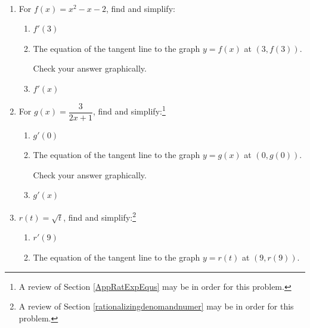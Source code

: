 \documentclass{ximera}
\begin{document}
\begin{ex}  \label{morederivativesex} $~$

\begin{enumerate}

\item  For $f(x) = x^2-x-2$, find and simplify:   



\begin{enumerate}

\item  $f'(3)$ %

\item  The equation of the tangent line to the graph $y = f(x)$ at $(3, f(3))$.  

Check your answer graphically.

\item  $f'(x)$ %

\end{enumerate}



\item  For $g(x) = \dfrac{3}{2x+1}$, find and simplify:\footnote{A review of Section \ref{AppRatExpEqus} may be in order for this problem.}



\begin{enumerate}

\item  $g'(0)$ %

\item  The equation of the tangent line to the graph $y = g(x)$ at $(0, g(0))$.  

Check your answer graphically.
 
\item  $g'(x)$ %

\end{enumerate}




\item  $r(t) = \sqrt{t}$,  find and simplify:\footnote{A review of Section \ref{rationalizingdenomandnumer} may be in order for this problem.}

\begin{enumerate}

\item $r'(9)$ %

\item  The equation of the tangent line to the graph $y = r(t)$ at $(9, r(9))$.


\end{enumerate}
\end{enumerate}
\end{ex}
\end{document}
